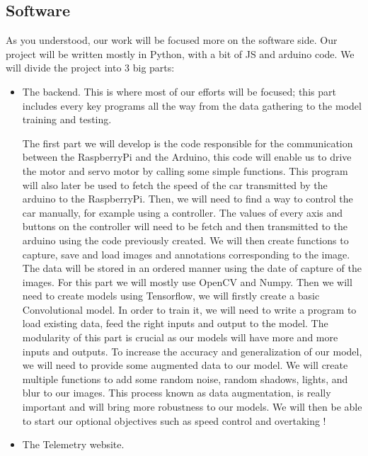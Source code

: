 \documentclass[12pt]{article}
\begin{document}
\subsection{Software}
As you understood, our work will be focused more on the software side.
Our project will be written mostly in Python, with a bit of JS and arduino code.
We will divide the project into 3 big parts:
\begin{itemize}
\item The backend. This is where most of our efforts will be focused; this part includes every key programs all the way from the data gathering to the model training and testing.

The first part we will develop is the code responsible for the communication between the RaspberryPi and the Arduino, this code will enable us to drive the motor and servo motor by calling some simple functions. This program will also later be used to fetch the speed of the car transmitted by the arduino to the RaspberryPi.
Then, we will need to find a way to control the car manually, for example using a controller. The values of every axis and buttons on the controller will need to be fetch and then transmitted to the arduino using the code previously created.
We will then create functions to capture, save and load images and annotations corresponding to the image. The data will be stored in an ordered manner using the date of capture of the images. For this part we will mostly use OpenCV and Numpy.
Then we will need to create models using Tensorflow, we will firstly create a basic Convolutional model. In order to train it, we will need to write a program to load existing data, feed the right inputs and output to the model. The modularity of this part is crucial as our models will have more and more inputs and outputs.
To increase the accuracy and generalization of our model, we will need to provide some augmented data to our model. We will create multiple functions to add some random noise, random shadows, lights, and blur to our images. This process known as data augmentation, is really important and will bring more robustness to our models.
We will then be able to start our optional objectives such as speed control and overtaking !

\item The Telemetry website.


\end{itemize}
\end{document}
